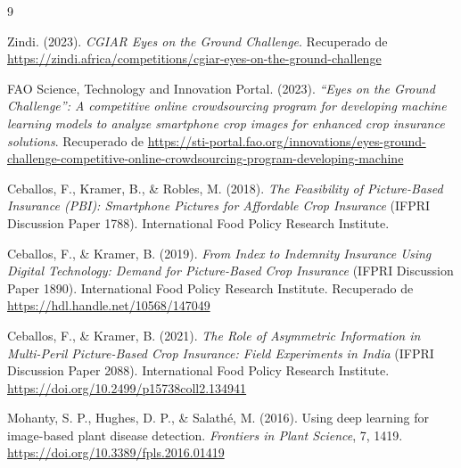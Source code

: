 \documentclass[11pt]{article}
\begin{document}
\newpage
{}
\begin{thebibliography}{9}

Zindi. (2023). \textit{CGIAR Eyes on the Ground Challenge}. Recuperado de \url{https://zindi.africa/competitions/cgiar-eyes-on-the-ground-challenge}

FAO Science, Technology and Innovation Portal. (2023). \textit{``Eyes on the Ground Challenge'': A competitive online crowdsourcing program for developing machine learning models to analyze smartphone crop images for enhanced crop insurance solutions}. Recuperado de \url{https://sti-portal.fao.org/innovations/eyes-ground-challenge-competitive-online-crowdsourcing-program-developing-machine}

Ceballos, F., Kramer, B., \& Robles, M. (2018). \textit{The Feasibility of Picture-Based Insurance (PBI): Smartphone Pictures for Affordable Crop Insurance} (IFPRI Discussion Paper 1788). International Food Policy Research Institute.

Ceballos, F., \& Kramer, B. (2019). \textit{From Index to Indemnity Insurance Using Digital Technology: Demand for Picture-Based Crop Insurance} (IFPRI Discussion Paper 1890). International Food Policy Research Institute. Recuperado de \url{https://hdl.handle.net/10568/147049}

Ceballos, F., \& Kramer, B. (2021). \textit{The Role of Asymmetric Information in Multi-Peril Picture-Based Crop Insurance: Field Experiments in India} (IFPRI Discussion Paper 2088). International Food Policy Research Institute. \url{https://doi.org/10.2499/p15738coll2.134941}

Mohanty, S. P., Hughes, D. P., \& Salathé, M. (2016). Using deep learning for image-based plant disease detection. \textit{Frontiers in Plant Science}, 7, 1419. \url{https://doi.org/10.3389/fpls.2016.01419}

\end{thebibliography}
\end{document}
